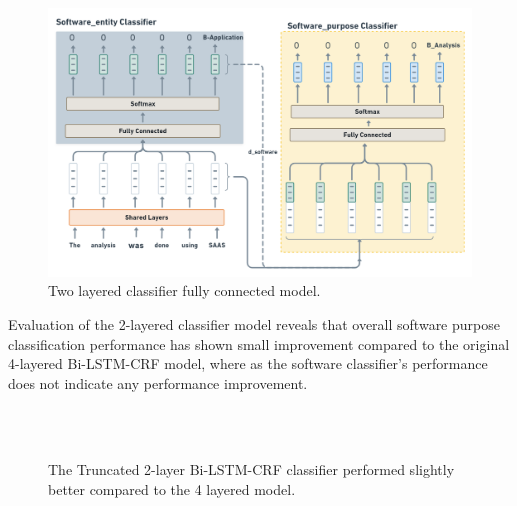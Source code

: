 \begin{figure}[htbp]
	\centering
	\includegraphics[width=.90\textwidth]{4.graphics/figures/ch_5/2LC}
	\caption{Two layered classifier fully connected model.}
	\label{fig:chapter06:with}
\end{figure}

Evaluation of the 2-layered classifier model reveals that overall software purpose classification performance has shown small improvement compared to the original 4-layered \ac{Bi-LSTM-CRF} model, where as the software classifier’s performance does not indicate any performance improvement.  

\begin{figure}[h]
	
	\myfloatalign
	
	 \\
	\\
	\caption[Subfloat - Figure]{The Truncated 2-layer \ac{Bi-LSTM-CRF} classifier performed slightly better compared to the 4 layered model.}
\end{figure}



